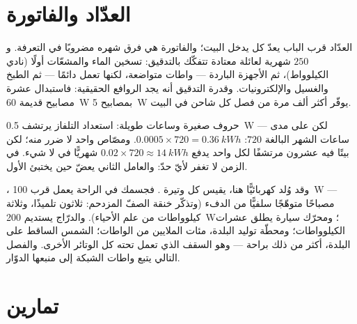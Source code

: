 \section{العدّاد والفاتورة}

\begin{example}\label{ex:g9:electric-power-energy:bill}
العدّاد قرب الباب يعدّ كل  يدخل البيت؛ والفاتورة
هي فرق شهره مضروبًا في التعرفة. و$250$  شهرية لعائلة
معتادة تتفكّك بالتدقيق: تسخين الماء والمشعّات أولًا (نادي
الكيلوواط)، ثم الأجهزة الباردة --- واطات متواضعة، لكنها تعمل
دائمًا --- ثم الطبخ والغسيل  والإلكترونيات. وقدرة
التدقيق أنه يجد الروافع الحقيقية: فاستبدال عشرة مصابيح قديمة
\qty{60}{W} بمصابيح \qty{5}{W} يوفّر أكثر ألف مرة من فصل كل
شاحن في البيت.
\end{example}

\begin{example}\label{ex:g9:electric-power-energy:standby}
حروف صغيرة وساعات طويلة:  استعداد التلفاز يرتشف
\qty{0.5}{W} --- لكن على مدى ساعات الشهر البالغة $720$:
$0.0005 \times 720 = \qty{0.36}{kWh}$. ومصّاص واحد لا ضرر
منه؛ لكن بيتًا فيه عشرون مرتشفًا  لكل واحد يدفع
$0.02 \times 720 \approx \qty{14}{kWh}$ شهريًّا في لا شيء.
 في الزمن لا تغفر لأيّ حدّ: والعامل الثاني يعضّ حين
يختبئ الأول.
\end{example}

\begin{remark}\label{rem:g9:electric-power-energy:wider}
، وقد وُلد كهربائيًّا هنا، يقيس كل وتيرة . فجسمك في
الراحة يعمل قرب \qty{100}{W} --- مصباحًا متوهّجًا سلفيًّا من
الدفء (وتذكّر خنقة الصفّ المزدحم: ثلاثون تلميذًا، وثلاثة
كيلوواطات من علم الأحياء). والدرّاج يستديم \qty{200}{W}؛ ومحرّك
سيارة يطلق عشرات الكيلوواطات؛ ومحطّة توليد البلدة، مئات
الملايين من الواطات؛  الشمس الساقط على البلدة، أكثر من ذلك
براحة --- وهو السقف الذي تعمل تحته كل الوتائر الأخرى. والفصل
التالي يتبع واطات الشبكة إلى منبعها الدوّار.
\end{remark}

\section{تمارين}

